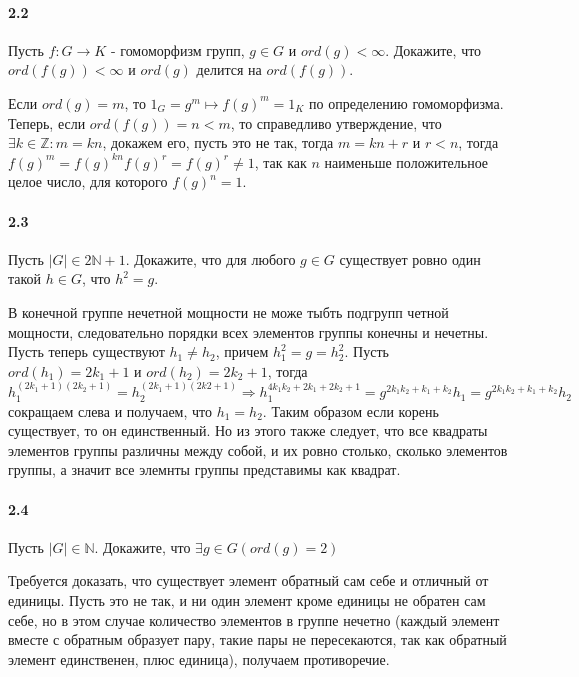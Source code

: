 \documentclass[a4paper,12pt]{article}
\begin{document}
\paragraph{2.2} Пусть $f: G \rightarrow K$ - гомоморфизм групп, $g \in G$ и $ord(g) < \infty$. Докажите, что $ord(f(g)) < \infty$ и $ord(g)$ делится на $ord(f(g))$.

\begin{Solution}
Если $ord(g) = m$, то $1_G = g^m \mapsto f(g)^m = 1_K$ по определению гомоморфизма. Теперь, если $ord(f(g)) = n < m$, то справедливо утверждение, что $\exists k \in \mathbb{Z} : m = kn$, докажем его, пусть это не так, тогда $m = kn + r$ и $r < n$, тогда $f(g)^m = f(g)^{kn}f(g)^r = f(g)^r \not= 1$, так как $n$ наименьше положительное целое число, для которого $f(g)^n = 1$.
\end{Solution}

\paragraph{2.3} Пусть $|G| \in 2\mathbb{N} + 1$. Докажите, что для любого $g \in G$ существует ровно один такой $h \in G$, что $h^2 = g$.

\begin{Solution}
В конечной группе нечетной мощности не може тыбть подгрупп четной мощности, следовательно порядки всех элементов группы конечны и нечетны. Пусть теперь существуют $h_1 \not = h_2$, причем $h_1^2 = g = h_2^2$. Пусть $ord(h_1) = 2 k_1 + 1$ и $ord(h_2) = 2 k_2 + 1$, тогда $h_1^{(2k_1 + 1)(2k_2 + 1)} = h_2^{(2 k_1 + 1)(2 k2 + 1)} \Rightarrow h_1^{4 k_1 k_2 + 2 k_1 + 2 k_2 + 1} = g^{2k_1k_2 + k_1 + k_2}h_1 = g^{2k_1 k_2 + k_1 + k_2}h_2$ сокращаем слева и получаем, что $h_1 = h_2$. Таким образом если корень существует, то он единственный. Но из этого также следует, что все квадраты элементов группы различны между собой, и их ровно столько, сколько элементов группы, а значит все элемнты группы представимы как квадрат.
\end{Solution}

\paragraph{2.4} Пусть $|G| \in \mathbb{N}$. Докажите, что $\exists g \in G (ord(g) = 2)$

\begin{Solution}
Требуется доказать, что существует элемент обратный сам себе и отличный от единицы. Пусть это не так, и ни один элемент кроме единицы не обратен сам себе, но в этом случае количество элементов в группе нечетно (каждый элемент вместе с обратным образует пару, такие пары не пересекаются, так как обратный элемент единственен, плюс единица), получаем противоречие.
\end{Solution}
\end{document}
